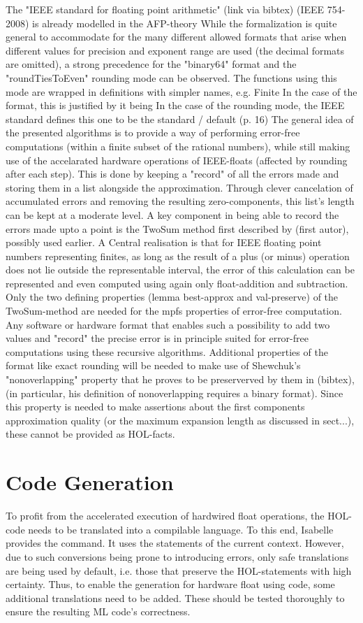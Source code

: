 \documentclass[11pt,a4paper]{article}
\begin{document}
The "IEEE standard for floating point arithmetic" (link via bibtex) (IEEE 754-2008) is already modelled in the AFP-theory
While the formalization is quite general to accommodate for the many different allowed formats that arise when different values for precision and exponent range are used (the decimal formats are omitted), a strong precedence for the "binary64" format and the "roundTiesToEven" rounding mode can be observed. The functions using this mode are wrapped in definitions with simpler names, e.g. Finite
In the case of the format, this is justified by it being
In the case of the rounding mode, the IEEE standard defines this one to be the standard / default (p. 16)
The general idea of the presented algorithms is to provide a way of performing error-free computations (within a finite subset of the rational numbers), while still making use of the accelarated hardware operations of IEEE-floats (affected by rounding after each step). This is done by keeping a "record" of all the errors made and storing them in a list alongside the approximation. Through clever cancelation of accumulated errors and removing the resulting zero-components, this list's length can be kept at a moderate level.
A key component in being able to record the errors made upto a point is the TwoSum method first described by (first autor), possibly used earlier. A Central realisation is that for IEEE floating point numbers representing finites, as long as the result of a plus (or minus) operation does not lie outside the representable interval, the error of this calculation can be represented and even computed using again only float-addition and subtraction.
Only the two defining properties (lemma best-approx and val-preserve) of the TwoSum-method are needed for the mpfs properties of error-free computation. Any software or hardware format that enables such a possibility to add two values and "record" the precise error is in principle suited for error-free computations using these recursive algorithms. Additional properties of the format like exact rounding will be needed to make use of Shewchuk's "nonoverlapping" property that he proves to be preserverved by them in (bibtex), (in particular, his definition of nonoverlapping requires a binary format). Since this property is needed to make assertions about the first components approximation quality (or the maximum expansion length as discussed in sect...), these cannot be provided as HOL-facts.

\section{Code Generation}
To profit from the accelerated execution of hardwired float operations, the HOL-code needs to be translated into a compilable language. To this end, Isabelle provides the
command. It uses the 
statements of the current context. However, due to such conversions being prone to introducing errors, only safe translations are being used by default, i.e. those that preserve the HOL-statements with high certainty. Thus, to enable the generation for hardware float using code, some additional translations need to be added. These should be tested thoroughly to ensure the resulting ML code's correctness.
\end{document}

